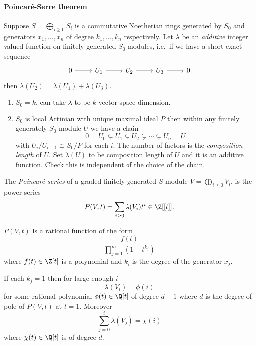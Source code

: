 \documentclass[a4paper]{article}
\begin{document}
\paragraph{Poincaré-Serre theorem}

Suppose \(S = \bigoplus_{i \geq 0} S_i\) is a commutative Noetherian rings generated by \(S_0\) and generators \(x_1, \dots, x_n\) of degree \(k_1, \dots, k_n\) respectively. Let \(\lambda\) be an \emph{additive} integer valued function on finitely generated \(S_0\)-modules, i.e.\ if we have a short exact sequence
\[
  \begin{tikzcd}
    0 \ar[r] & U_1 \ar[r] & U_2 \ar[r] & U_3 \ar[r] & 0
  \end{tikzcd}
\]
then \(\lambda(U_2) = \lambda(U_1) + \lambda(U_3)\).

\begin{eg}\leavevmode
  \begin{enumerate}
  \item \(S_0 = k\), can take \(\lambda\) to be \(k\)-vector space dimension.
  \item \(S_0\) is local Artinian with unique maximal ideal \(P\) then within any finitely generately \(S_0\)-module \(U\) we have a chain
    \[
      0 = U_0 \subsetneq U_1 \subsetneq U_2 \subsetneq \cdots \subsetneq U_n = U
    \]
    with \(U_i/U_{i - 1} \cong S_0/P\) for each \(i\). The number of factors is the \emph{composition length} of \(U\). Set \(\lambda(U)\) to be composition length of \(U\) and it is an additive function. Check this is independent of the choice of the chain.
  \end{enumerate}
\end{eg}

\begin{definition}
  The \emph{Poincaré series} of a graded finitely generated \(S\)-module \(V = \bigoplus_{i \geq 0} V_i\), is the power series
  \[
    P(V, t) = \sum_{i \geq 0} \lambda(V_i) t^i \in \Z[[t]].
  \]
\end{definition}

\begin{theorem}
  \label{thm:Hilbert-Serre}
  \(P(V, t)\) is a rational function of the form
  \[
    \frac{f(t)}{\prod_{j =1}^m (1 - t^{k_j})}
  \]
  where \(f(t) \in \Z[t]\) is a polynomial and \(k_j\) is the degree of the generator \(x_j\).
\end{theorem}

\begin{corollary}
  \label{cor:corollary of Hilbert-Serre}
  If each \(k_j = 1\) then for large enough \(i\)
  \[
    \lambda(V_i) = \phi(i)
  \]
  for some rational polynomial \(\phi(t) \in \Q[t]\) of degree \(d - 1\) where \(d\) is the degree of pole of \(P(V, t)\) at \(t = 1\). Moreover
  \[
    \sum_{j = 0}^i \lambda(V_j) = \chi(i)
  \]
  where \(\chi(t) \in \Q[t]\) is of degree \(d\).
\end{corollary}
\end{document}
